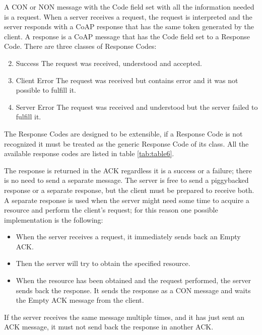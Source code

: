 	A CON or NON message with the Code field set with all the information needed is a request.\newline
	When a server receives a request, the request is interpreted and the server responds with a CoAP response that has the same token generated by the client.\newline
	A response is a CoAP message that has the Code field set to a Response Code.\newline
	There are three classes of Response Codes:\newline
	\begin{enumerate}
		\setcounter{enumi}{1}
		
		\item Success
		The request was received, understood and accepted.
		
		\setcounter{enumi}{3}
		
		\item Client Error
		The request was received but contains error and it was not possible to fulfill it.
		
		\item Server Error
		The request was received and understood but the server failed to fulfill it.
		
	\end{enumerate}
	
	The Response Codes are designed to be extensible, if a Response Code is not recognized it must be treated as the generic Response Code of its class.\newline
	All the available response codes are listed in table \ref{tab:table6}.\newline
	

	The response is returned in the ACK regardless it is a success or a failure; there is no need to send a separate message.\newline
	The server is free to send a piggybacked response or a separate response, but the client must be prepared to receive both.\newline
	A separate response is used when the server might need some time to acquire a resource and perform the client’s request; for this reason one possible implementation is the following:
	\begin{itemize}
		\item When the server receives a request, it immediately sends back an Empty ACK.
		\item Then the server will try to obtain the specified resource.
		\item When the resource has been obtained and the request performed, the server sends back the response.
		It sends the response as a CON message and waits the Empty ACK message from the client.
	\end{itemize}
	If the server receives the same message multiple times, and it has just sent an ACK message, it must not send back the response in another ACK.\newline
	
